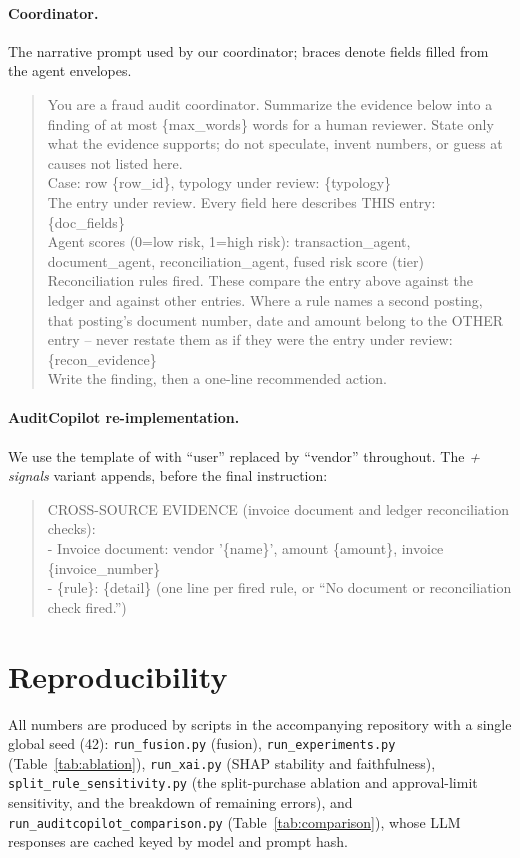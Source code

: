 \documentclass{article}
\begin{document}
\paragraph{Coordinator.} The narrative prompt used by our coordinator; braces denote fields filled from the agent envelopes.
\begin{quote}\small\ttfamily
You are a fraud audit coordinator. Summarize the evidence below into a finding of at most \{max\_words\} words for a human reviewer. State only what the evidence supports; do not speculate, invent numbers, or guess at causes not listed here.\\[2pt]
Case: row \{row\_id\}, typology under review: \{typology\}\\[2pt]
The entry under review. Every field here describes THIS entry: \{doc\_fields\}\\[2pt]
Agent scores (0=low risk, 1=high risk): transaction\_agent, document\_agent, reconciliation\_agent, fused risk score (tier)\\[2pt]
Reconciliation rules fired. These compare the entry above against the ledger and against other entries. Where a rule names a second posting, that posting's document number, date and amount belong to the OTHER entry -- never restate them as if they were the entry under review: \{recon\_evidence\}\\[2pt]
Write the finding, then a one-line recommended action.
\end{quote}

\paragraph{AuditCopilot re-implementation.} We use the template of \citet[Fig.~1]{kadir2025auditcopilot} with ``user'' replaced by ``vendor'' throughout. The \emph{+ signals} variant appends, before the final instruction:
\begin{quote}\small\ttfamily
CROSS-SOURCE EVIDENCE (invoice document and ledger reconciliation checks):\\
- Invoice document: vendor '\{name\}', amount \{amount\}, invoice \{invoice\_number\}\\
- \{rule\}: \{detail\} \quad (one line per fired rule, or ``No document or reconciliation check fired.'')
\end{quote}

\section{Reproducibility}

All numbers are produced by scripts in the accompanying repository with a single global seed (42): \texttt{run\_fusion.py} (fusion), \texttt{run\_experiments.py} (Table~\ref{tab:ablation}), \texttt{run\_xai.py} (SHAP stability and faithfulness), \texttt{split\_rule\_sensitivity.py} (the split-purchase ablation and approval-limit sensitivity, and the breakdown of remaining errors), and \texttt{run\_auditcopilot\_comparison.py} (Table~\ref{tab:comparison}), whose LLM responses are cached keyed by model and prompt hash.
\end{document}
